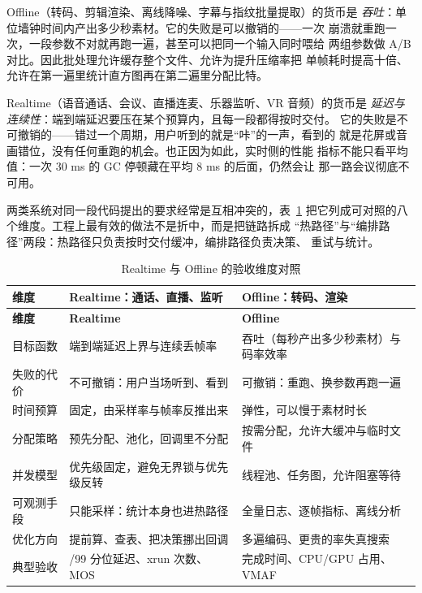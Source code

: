 \documentclass[12pt,a4paper,fontset=fandol]{ctexbook}
\newcommand{\Lang}[1]{\textsf{#1}}
\newcommand{\DomRT}{\Lang{Realtime}}
\newcommand{\DomBatch}{\Lang{Offline}}
\begin{document}
\DomBatch{}（转码、剪辑渲染、离线降噪、字幕与指纹批量提取）的货币是
\emph{吞吐}：单位墙钟时间内产出多少秒素材。它的失败是可以撤销的——一次
崩溃就重跑一次，一段参数不对就再跑一遍，甚至可以把同一个输入同时喂给
两组参数做 A/B 对比。因此批处理允许缓存整个文件、允许为提升压缩率把
单帧耗时提高十倍、允许在第一遍里统计直方图再在第二遍里分配比特。

\DomRT{}（语音通话、会议、直播连麦、乐器监听、VR 音频）的货币是
\emph{延迟与连续性}：端到端延迟要压在某个预算内，且每一段都得按时交付。
它的失败是不可撤销的——错过一个周期，用户听到的就是``咔''的一声，看到的
就是花屏或音画错位，没有任何重跑的机会。也正因为如此，实时侧的性能
指标不能只看平均值：一次 30 ms 的 GC 停顿藏在平均 8 ms 的后面，仍然会让
那一路会议彻底不可用。

两类系统对同一段代码提出的要求经常是互相冲突的，表~\ref{tab:ch01-timeline}
把它列成可对照的八个维度。工程上最有效的做法不是折中，而是把链路拆成
``热路径''与``编排路径''两段：热路径只负责按时交付缓冲，编排路径负责决策、
重试与统计。

\begin{longtable}{>{\raggedright\arraybackslash}p{}
                  >{\raggedright\arraybackslash}p{}
                  >{\raggedright\arraybackslash}p{}}
\caption{\DomRT{} 与 \DomBatch{} 的验收维度对照}\label{tab:ch01-timeline} \\
\toprule
\textbf{维度} & \textbf{\DomRT{}：通话、直播、监听} & \textbf{\DomBatch{}：转码、渲染} \\
\midrule
\endfirsthead
\toprule
\textbf{维度} & \textbf{\DomRT{}} & \textbf{\DomBatch{}} \\
\midrule
\endhead
\midrule
\bottomrule
\endlastfoot
目标函数 & 端到端延迟上界与连续丢帧率 & 吞吐（每秒产出多少秒素材）与码率效率 \\
失败的代价 & 不可撤销：用户当场听到、看到 & 可撤销：重跑、换参数再跑一遍 \\
时间预算 & 固定，由采样率与帧率反推出来 & 弹性，可以慢于素材时长 \\
分配策略 & 预先分配、池化，回调里不分配 & 按需分配，允许大缓冲与临时文件 \\
并发模型 & 优先级固定，避免无界锁与优先级反转 & 线程池、任务图，允许阻塞等待 \\
可观测手段 & 只能采样：统计本身也进热路径 & 全量日志、逐帧指标、离线分析 \\
优化方向 & 提前算、查表、把决策挪出回调 & 多遍编码、更贵的率失真搜索 \\
典型验收 & 95/99 分位延迟、xrun 次数、MOS & 完成时间、CPU/GPU 占用、VMAF \\
\end{longtable}
\end{document}

